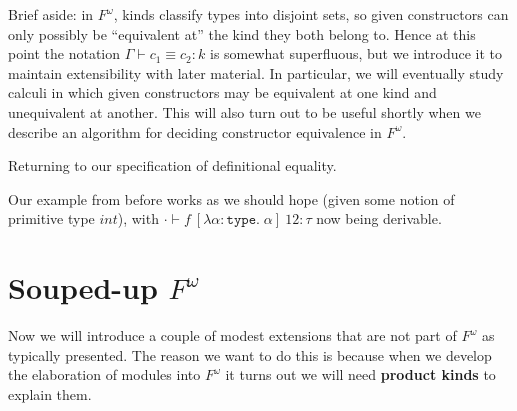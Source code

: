 \documentclass{amsart}
\newcommand{\type}{\ensuremath{\mathtt{type}}}
\begin{document}
Brief aside: in $F^\omega$, kinds classify types into disjoint sets, so given constructors can only possibly be ``equivalent at'' the kind they both belong to. Hence at this point the notation $\Gamma \vdash c_1 \equiv c_2 : k$ is somewhat superfluous, but we introduce it to maintain extensibility with later material. In particular, we will eventually study calculi in which given constructors may be equivalent at one kind and unequivalent at another. This will also turn out to be useful shortly when we describe an algorithm for deciding constructor equivalence in $F^\omega$.

Returning to our specification of definitional equality.


Our example from before works as we should hope (given some notion of primitive type $int$), with $\cdot \vdash f \ [\lambda \alpha : \type. \; \alpha] \ 12 : \tau$ now being derivable.

\section{Souped-up $F^\omega$}
Now we will introduce a couple of modest extensions that are not part of $F^\omega$ as typically presented. The reason we want to do this is because when we develop the elaboration of modules into $F^\omega$ it turns out we will need {\bf product kinds} to explain them.
\end{document}
